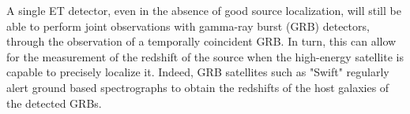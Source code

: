 
A single ET detector, even in the absence of good source localization, will still be able to perform joint observations with gamma-ray burst (GRB) detectors, through  the observation of a temporally coincident GRB. In turn, this  can  allow for the measurement of the redshift of the source when the high-energy satellite is capable to precisely  localize it. Indeed, GRB satellites such as "Swift" regularly alert ground based spectrographs to obtain the redshifts of the host galaxies of the detected GRBs. 



